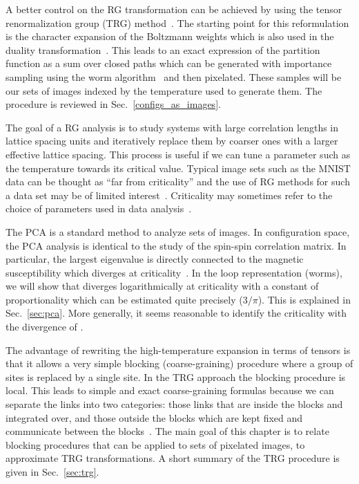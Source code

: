 \documentclass[../main.tex]{subfiles}
\begin{document}
A better control on the RG transformation can be achieved by using the tensor renormalization group (TRG)
method~\cite{PhysRevLett.99.120601,PhysRevB.79.085118,PhysRevB.86.045139,prb87,prd88,prd89,pre89}.
%
The starting point for this reformulation is the character expansion of the Boltzmann weights which is also used in the
duality transformation~\cite{RevModPhys.52.453}.
%
This leads to an exact expression of the partition function  as a sum over closed paths which can be generated with
importance sampling using  the worm algorithm~\cite{prok87} and then pixelated.
%
These samples will be our sets of images indexed by the temperature used to generate them.  The procedure is reviewed
in Sec.~\ref{configs_as_images}. 

The goal of a RG analysis is to study systems with large correlation lengths in lattice spacing units and iteratively
replace them by coarser ones with a larger effective lattice spacing.
%
This process is useful if we can tune a parameter such as the temperature towards its critical value.
%
Typical image sets such as the MNIST data can be thought as ``far from criticality'' and the use of RG methods for such
a data set may be of limited interest~\cite{foreman2017}.  Criticality may sometimes refer to the choice of parameters
used in data analysis~\cite{PhysRevD.83.105014}. 

The PCA is a standard method to analyze sets of images.
%
In configuration space, the PCA analysis is identical to the study of the spin-spin correlation matrix.
%
In particular, the largest eigenvalue \lm  is directly connected to the magnetic susceptibility which diverges at
criticality~\cite{PhysRevB.94.195105}.
%
In the loop representation (worms), we will show that \lm diverges logarithmically at criticality  with a constant of
proportionality which can be estimated quite precisely ($3/\pi$).
%
This is explained in Sec.~\ref{sec:pca}.  More generally, it seems reasonable to identify the criticality with the
divergence of \lm.

The advantage of rewriting the high-temperature expansion in terms of tensors is that it allows a very simple blocking
(coarse-graining) procedure where a group of sites is replaced by a single site.
%
In the TRG approach the blocking procedure is local.
%
This leads to simple and exact coarse-graining formulas because we can separate the links into two categories: those
links that are inside the blocks and integrated over, and those outside the blocks which are kept fixed and communicate
between the blocks~\cite{prb87}.
%
The main goal of this chapter is to relate blocking procedures that can be applied to sets of pixelated images, to
approximate TRG transformations.
%
A short summary of the TRG procedure is given in Sec.~\ref{sec:trg}.
\end{document}
